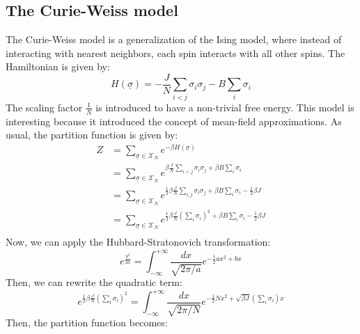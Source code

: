 \subsection{The Curie-Weiss model}
The Curie-Weiss model is a generalization of the Ising model, where instead of interacting with nearest neighbors, each spin interacts with all other spins. The Hamiltonian is given by:
\begin{equation}
    H(\underline{\sigma}) = -\frac{J}{N}\sum_{i<j}\sigma_i\sigma_j - B\sum_i \sigma_i
\end{equation}
The scaling factor $\frac{1}{N}$ is introduced to have a non-trivial free energy. This model is interesting because it introduced the concept of mean-field approximations. As usual, the partition function is given by:
\begin{equation}
    \begin{aligned}
        Z &= \sum_{\underline{\sigma}\in\mathcal{X}_N}e^{-\beta H(\underline{\sigma})}\\
        &= \sum_{\underline{\sigma}\in\mathcal{X}_N}e^{\beta\frac{J}{N}\sum_{i<j}\sigma_i\sigma_j+\beta B \sum_i \sigma_i}\\
        &= \sum_{\underline{\sigma}\in\mathcal{X}_N}e^{\frac{1}{2}\beta\frac{J}{N}\sum_{i,j}\sigma_i\sigma_j+\beta B \sum_i \sigma_i-\frac{1}{2}\beta J}\\
        &= \sum_{\underline{\sigma}\in\mathcal{X}_N}e^{\frac{1}{2}\beta\frac{J}{N}\left(\sum_{i}\sigma_i\right)^2+\beta B \sum_i \sigma_i-\frac{1}{2}\beta J}\\
    \end{aligned}
\end{equation}
Now, we can apply the Hubbard-Stratonovich transformation:
\begin{equation}
    e^{\frac{b^2}{2a}} = \int_{-\infty}^{+\infty}\frac{dx}{\sqrt{2\pi/ a}} e^{-\frac{1}{2}ax^2+bx}
\end{equation}
Then, we can rewrite the quadratic term:
\begin{equation}
    e^{\frac{1}{2}\beta\frac{J}{N}\left(\sum_{i}\sigma_i\right)^2} = \int_{-\infty}^{+\infty}\frac{dx}{\sqrt{2\pi/N}} e^{-\frac{1}{2}Nx^2+\sqrt{\beta J}\left(\sum_i \sigma_i\right)x}
\end{equation}
Then, the partition function becomes:
